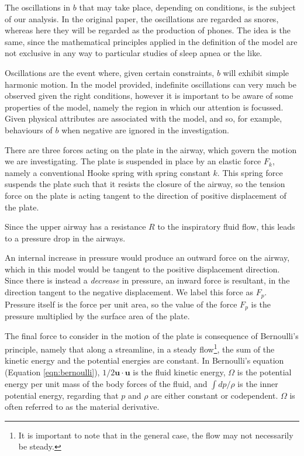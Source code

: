 \documentclass{article}
\begin{document}

The oscillations in $b$ that may take place, depending on conditions, is the subject of our analysis.
In the original paper, the oscillations are regarded as snores,
whereas here they will be regarded as the production of phones.
The idea is the same, since the mathematical principles applied in the definition of the model are not exclusive in any way to particular studies of sleep apnea or the like.

Oscillations are the event where, given certain constraints, $b$ will exhibit simple harmonic motion. %
In the model provided, indefinite oscillations can very much be observed given the right conditions,
however it is important to be aware of some properties of the model,
namely the region in which our attention is focussed. Given physical attributes are associated with the model,
and so, for example, behaviours of $b$ when negative are ignored in the investigation.

There are three forces acting on the plate in the airway, which govern the motion we are investigating.
The plate is suspended in place by an elastic force $F_k$, namely a conventional Hooke spring with spring constant $k$.
This spring force suspends the plate such that it resists the closure of the airway,
so the tension force on the plate is acting tangent to the direction of positive displacement of the plate.


Since the upper airway has a resistance $R$ to the inspiratory fluid flow,
this leads to a pressure drop in the airways. %

An internal increase in pressure would produce an outward force on the airway,
which in this model would be tangent to the positive displacement direction.
Since there is instead a \textit{decrease} in pressure, an inward force is resultant,
in the direction tangent to the negative displacement. We label this force as $F_p$.
Pressure itself is the force per unit area,
so the value of the force $F_p$ is the pressure multiplied by the surface area of the plate.

The final force to consider in the motion of the plate is consequence of Bernoulli's principle,
namely that along a streamline, in a steady flow\footnote{It is important to note that in the general case, the flow may not necessarily be steady.},
the sum of the kinetic energy and the potential energies are constant.
In Bernoulli's equation (Equation \ref{eqn:bernoulli}), $1/2\mathbf{u}\cdot\mathbf{u}$ is the fluid kinetic energy,
$\Omega$ is the potential energy per unit mass of the body forces of the fluid,
and $\int dp/\rho$ is the inner potential energy, regarding that $p$ and $\rho$ are either constant or codependent.
$\Omega$ is often referred to as the material derivative.
\end{document}
